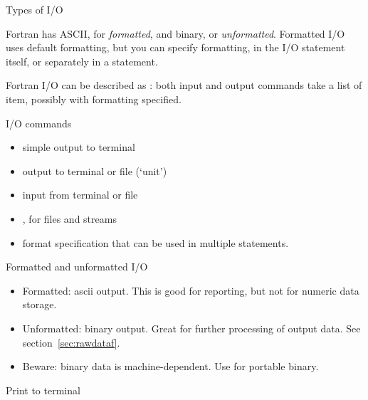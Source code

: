 
 {Types of I/O}

Fortran has ASCII, for \emph{formatted},
and binary, or \emph{unformatted}.
Formatted I/O uses default formatting, but you can specify formatting,
in the I/O statement itself, or separately in a  statement.

Fortran I/O can be described as :
both input and output commands take a list of item, possibly with
formatting specified.

\begin{block}{I/O commands}
  \label{sl:fio-commands}
  \begin{itemize}
  \item {} simple output to terminal
  \item {} output to terminal or file (`unit')
  \item {} input from terminal or file
  \item {},  for files and
    streams
  \item {} format specification that can be used
    in multiple statements.
  \end{itemize}
\end{block}

\begin{block}{Formatted and unformatted I/O}
  \label{sl:fio-types}
  \begin{itemize}
  \item Formatted: ascii output. This is good for reporting, but not
    for numeric data storage.
  \item Unformatted: binary output. Great for further processing of
    output data. See section~\ref{sec:rawdataf}.
  \item Beware: binary data is machine-dependent. Use 
    for portable binary.
  \end{itemize}
\end{block}

 {Print to terminal}

